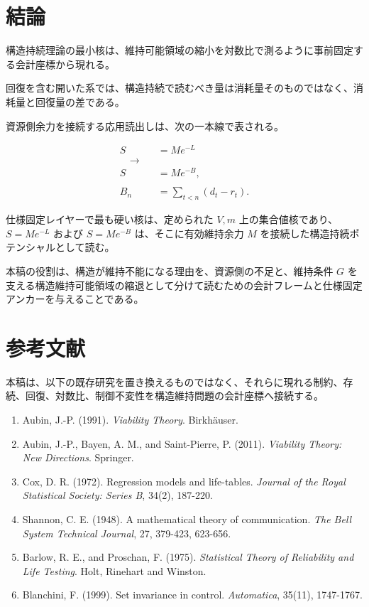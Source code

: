 \documentclass[12pt,a4paper]{article}
\begin{document}
\section{結論}\label{ux7d50ux8ad6}

構造持続理論の最小核は、維持可能領域の縮小を対数比で測るように事前固定する会計座標から現れる。

回復を含む開いた系では、構造持続で読むべき量は消耗量そのものではなく、消耗量と回復量の差である。

資源側余力を接続する応用読出しは、次の一本線で表される。

\[
\begin{aligned}
S&=Me^{-L} \\
\quad\longrightarrow\quad \\
S&=Me^{-B}, \\
\qquad \\
B_{n}&=\sum_{t<n}(d_{t}-r_{t}).
\end{aligned}
\]

仕様固定レイヤーで最も硬い核は、定められた \(V,m\) 上の集合値核であり、\(S=Me^{-L}\) および \(S=Me^{-B}\) は、そこに有効維持余力 \(M\) を接続した構造持続ポテンシャルとして読む。

本稿の役割は、構造が維持不能になる理由を、資源側の不足と、維持条件 \(G\) を支える構造維持可能領域の縮退として分けて読むための会計フレームと仕様固定アンカーを与えることである。

\section{参考文献}\label{ux53c2ux8003ux6587ux732e}

本稿は、以下の既存研究を置き換えるものではなく、それらに現れる制約、存続、回復、対数比、制御不変性を構造維持問題の会計座標へ接続する。

\begin{enumerate}
\def\labelenumi{\arabic{enumi}.}
\tightlist
\item
  Aubin, J.-P. (1991). \emph{Viability Theory}. Birkhäuser.
\item
  Aubin, J.-P., Bayen, A. M., and Saint-Pierre, P. (2011). \emph{Viability Theory: New Directions}. Springer.
\item
  Cox, D. R. (1972). Regression models and life-tables. \emph{Journal of the Royal Statistical Society: Series B}, 34(2), 187-220.
\item
  Shannon, C. E. (1948). A mathematical theory of communication. \emph{The Bell System Technical Journal}, 27, 379-423, 623-656.
\item
  Barlow, R. E., and Proschan, F. (1975). \emph{Statistical Theory of Reliability and Life Testing}. Holt, Rinehart and Winston.
\item
  Blanchini, F. (1999). Set invariance in control. \emph{Automatica}, 35(11), 1747-1767.
\end{enumerate}
\end{document}
